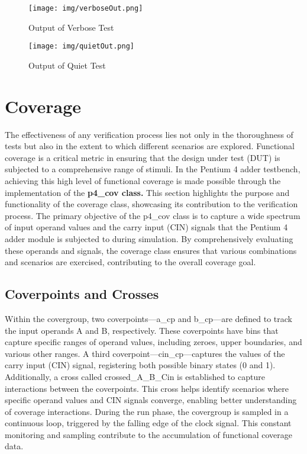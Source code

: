 \documentclass[12pt,a4paper]{report}
\begin{document}
 \begin{figure}[H]
\centering
\texttt{[image: img/verboseOut.png]}
\label{Verbose Output}
\caption{Output of Verbose Test}
\end{figure}
\vspace{0.3cm}

 \begin{figure}[H]
\centering
\texttt{[image: img/quietOut.png]}
\label{Verbose Output}
\caption{Output of Quiet Test}
\end{figure}
\vspace{0.3cm}

\section{Coverage}
The effectiveness of any verification process lies not only in the thoroughness of tests but also in the extent to which different scenarios are explored. Functional coverage is a critical metric in ensuring that the design under test (DUT) is subjected to a comprehensive range of stimuli. In the Pentium 4 adder testbench, achieving this high level of functional coverage is made possible through the implementation of the \textbf{p4\_cov class.} This section highlights the purpose and functionality of the coverage class, showcasing its contribution to the verification process.
The primary objective of the p4\_cov class is to capture a wide spectrum of input operand values and the carry input (CIN) signals that the Pentium 4 adder module is subjected to during simulation. By comprehensively evaluating these operands and signals, the coverage class ensures that various combinations and scenarios are exercised, contributing to the overall coverage goal.
\subsection{Coverpoints and Crosses}
Within the covergroup, two coverpoints—a\_cp and b\_cp—are defined to track the input operands A and B, respectively. These coverpoints have bins that capture specific ranges of operand values, including zeroes, upper boundaries, and various other ranges. A third coverpoint—cin\_cp—captures the values of the carry input (CIN) signal, registering both possible binary states (0 and 1).
Additionally, a cross called crossed\_A\_B\_Cin is established to capture interactions between the coverpoints. This cross helps identify scenarios where specific operand values and CIN signals converge, enabling better understanding of coverage interactions.
During the run phase, the covergroup is sampled in a continuous loop, triggered by the falling edge of the clock signal. This constant monitoring and sampling contribute to the accumulation of functional coverage data.
\end{document}
